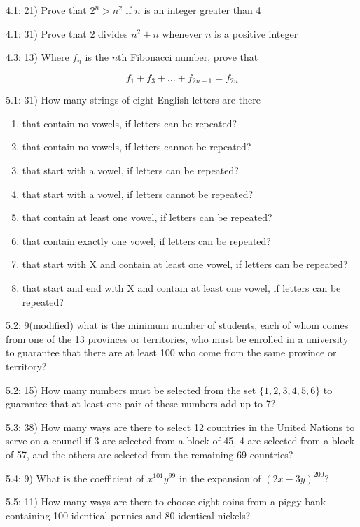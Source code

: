 \documentclass{article}
\begin{document}
4.1: 21) Prove that $2^n > n^2$ if $n$ is an integer greater than 4

4.1: 31) Prove that 2 divides $n^2 + n$ whenever $n$ is a positive integer

4.3: 13) Where $f_n$ is the $n$th Fibonacci number, prove that

\[
f_1 + f_3 + ... + f_{2n-1} = f_{2n}
\]

5.1: 31) How many strings of eight English letters are there

\begin{enumerate}[label=\alph{enumi})]
\item that contain no vowels, if letters can be repeated?
\item that contain no vowels, if letters cannot be repeated?
\item that start with a vowel, if letters can be repeated?
\item that start with a vowel, if letters cannot be repeated?
\item that contain at least one vowel, if letters can be repeated?
\item that contain exactly one vowel, if letters can be repeated?
\item that start with X and contain at least one vowel, if letters can be repeated?
\item that start and end with X and contain at least one vowel, if
  letters can be repeated?
\end{enumerate}

5.2: 9(modified) what is the minimum number of students, each of whom
comes from one of the 13 provinces or territories, who must be
enrolled in a university to guarantee that there are at least 100 who
come from the same province or territory?

5.2: 15) How many numbers must be selected from the set
$\{1,2,3,4,5,6\}$ to guarantee that at least one pair of these numbers
add up to 7?

5.3: 38) How many ways are there to select 12 countries in the United
Nations to serve on a council if 3 are selected from a block of 45, 4
are selected from a block of 57, and the others are selected from the
remaining 69 countries?

5.4: 9) What is the coefficient of $x^{101}y^{99}$ in the expansion of
$(2x-3y)^{200}$?

5.5: 11) How many ways are there to choose eight coins from a piggy
bank containing 100 identical pennies and 80 identical nickels?
\end{document}
